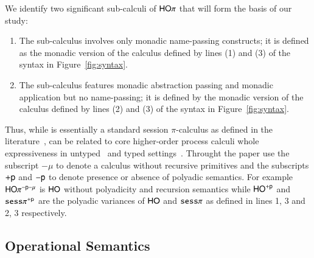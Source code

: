 We identify two significant sub-calculi of $\mathsf{HO}\pi$ that will form 
the basis of our study:
%
\begin{enumerate}[-]
	\item	The sub-calculus \sessp involves only monadic name-passing constructs; it is 
		defined as the monadic version of the calculus defined by lines (1) and (3)
		of the syntax in Figure~\ref{fig:syntax}.

	\item	The sub-calculus \HO features monadic abstraction passing and monadic application
		but no name-passing; 
		it is defined by the monadic version of the calculus defined by lines (2) and (3) of
		the syntax in Figure~\ref{fig:syntax}.
\end{enumerate}
%
Thus, while \sessp is essentially a standard session $\pi$-calculus as defined in the
literature~\cite{honda.vasconcelos.kubo:language-primitives,GH05},
\HO can be related to core higher-order process calculi whole expressiveness
in untyped~\cite{} and typed settings~\cite{}.%
Throught the paper use the subscript $-\mu$ to denote a calculus without recursive
primitives and the subscripts $+\mathsf{p}$ and $-\mathsf{p}$ to denote presence or
absence of polyadic semantics. For example $\mathsf{HO}\pi^{-\mathsf{p}-\mu}$ is $\mathsf{HO}$ without
polyadicity and recursion semantics while $\mathsf{HO}^{+\mathsf{p}}$ and $\mathtt{sess}\pi^{+\mathsf{p}}$
are the polyadic variances of $\mathsf{HO}$ and $\mathtt{sess}\pi$ as defined in lines 1, 3 and 2, 3 respectively.

\subsection{Operational Semantics}

